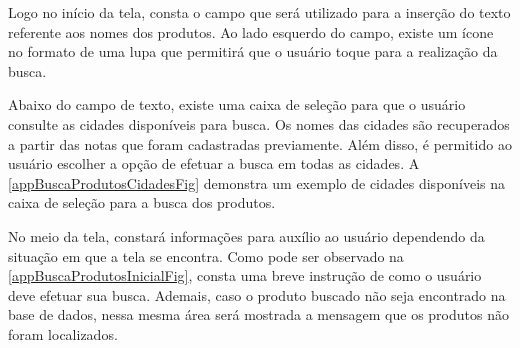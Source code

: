 Logo no início da tela, consta o campo que será utilizado para a inserção do texto referente aos nomes dos produtos. Ao lado esquerdo do campo, existe um ícone no formato de uma lupa que permitirá que o usuário toque para a realização da busca.

Abaixo do campo de texto, existe uma caixa de seleção para que o usuário consulte as cidades disponíveis para busca. Os nomes das cidades são recuperados a partir das notas que foram cadastradas previamente. Além disso, é permitido ao usuário escolher a opção de efetuar a busca em todas as cidades. A \autoref{appBuscaProdutosCidadesFig} demonstra um exemplo de cidades disponíveis na caixa de seleção para a busca dos produtos.

No meio da tela, constará informações para auxílio ao usuário dependendo da situação em que a tela se encontra. Como pode ser observado na \autoref{appBuscaProdutosInicialFig}, consta uma breve instrução de como o usuário deve efetuar sua busca. Ademais, caso o produto buscado não seja encontrado na base de dados, nessa mesma área será mostrada a mensagem que os produtos não foram localizados.

